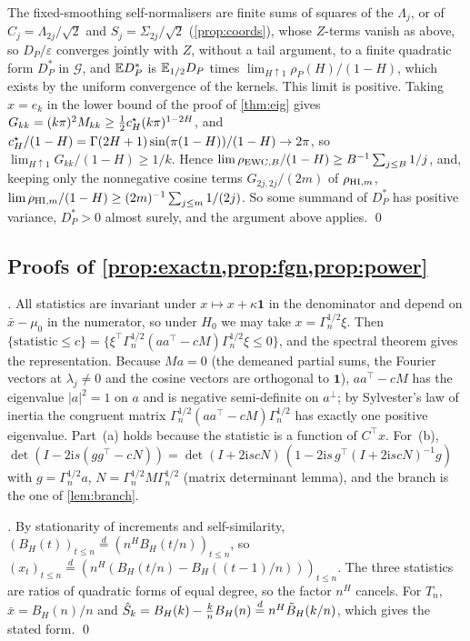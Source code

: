 The fixed-smoothing self-normalisers are finite sums of squares of the $\Lambda_j$, or of $C_j=\Lambda_{2j}/\sqrt2$ and
$S_j=\Sigma_{2j}/\sqrt2$ (\cref{prop:coords}), whose $Z$-terms vanish as above, so $D_P/\varepsilon$ converges jointly with $Z$, without a tail
argument, to a finite quadratic form $D_P^*$ in $\mathcal G$, and $\mathbb E D_P^*$ is $\mathbb E_{1/2}D_P$ times
$\lim_{H\uparrow1}\rho_P(H)/(1-H)$, which exists by the uniform convergence of the kernels. This limit is positive.
Taking $x=e_k$ in the lower bound of the proof of \cref{thm:eig} gives
$G_{kk}=(k\pi)^2M_{kk}\ge\frac12c^{\star}_H(k\pi)^{1-2H}$, and $c^{\star}_H/(1-H)=\Gamma(2H+1)\sin(\pi(1-H))/(1-H)\to2\pi$, so
$\lim_{H\uparrow1}G_{kk}/(1-H)\ge1/k$. Hence $\lim\rho_{\mathrm{EWC},B}/(1-H)\ge B^{-1}\sum_{j\le B}1/j$, and, keeping only the
nonnegative cosine terms $G_{2j,2j}/(2m)$ of $\rho_{\mathrm{HI},m}$, $\lim\rho_{\mathrm{HI},m}/(1-H)\ge(2m)^{-1}\sum_{j\le m}1/(2j)$. So some
summand of $D_P^*$ has positive variance, $D_P^*>0$ almost surely, and the argument above applies. \qed

\subsection{Proofs of \texorpdfstring{\cref{prop:exactn,prop:fgn,prop:power}}{finite-sample laws and local power}}
\emph{.} All statistics are invariant under $x\mapsto x+\kappa\mathbf 1$ in the denominator and depend
on $\bar x-\mu_0$ in the numerator, so under $H_0$ we may take $x=\Gamma_n^{1/2}\xi$. Then
$\{\text{statistic}\le c\}=\{\xi^\top\Gamma_n^{1/2}(aa^\top-cM)\Gamma_n^{1/2}\xi\le0\}$, and the spectral theorem gives the
representation. Because $Ma=0$ (the demeaned partial sums, the Fourier vectors at $\lambda_j\ne0$ and the cosine vectors
are orthogonal to $\mathbf 1$), $aa^\top-cM$ has the eigenvalue $|a|^2=1$ on $a$ and is negative semi-definite on
$a^\perp$; by Sylvester's law of inertia the congruent matrix $\Gamma_n^{1/2}(aa^\top-cM)\Gamma_n^{1/2}$ has exactly one
positive eigenvalue. Part~(a) holds because the statistic is a function of $C^\top x$. For~(b),
$\det(I-2\mathrm is(gg^\top-cN))=\det(I+2\mathrm iscN)\,(1-2\mathrm is\,g^\top(I+2\mathrm iscN)^{-1}g)$ with
$g=\Gamma_n^{1/2}a$, $N=\Gamma_n^{1/2}M\Gamma_n^{1/2}$ (matrix determinant lemma), and the branch is the one of
\cref{lem:branch}.

\emph{.} By stationarity of increments and self-similarity,
$(B_H(t))_{t\le n}\overset d=(n^HB_H(t/n))_{t\le n}$, so $(x_t)_{t\le n}\overset d=(n^H(B_H(t/n)-B_H((t-1)/n)))_{t\le n}$.
The three statistics are ratios of quadratic forms of equal degree, so the factor $n^H$ cancels. For $T_n$,
$\bar x=B_H(n)/n$ and $\hat S_k=B_H(k)-\frac knB_H(n)\overset d=n^H\tilde B_H(k/n)$, which gives the stated form. \qed

